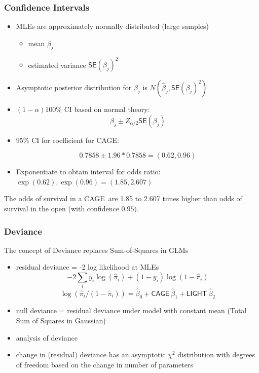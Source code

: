 \documentclass[handout]{beamer}\usepackage[]{graphicx}\usepackage[]{color}
\def\SE{\textsf{SE}}
\def\C{\textsf{CAGE}}
\def\L{\textsf{LIGHT}}
\begin{document}
\begin{frame}[fragile]\frametitle{Confidence Intervals}


  \begin{itemize}
  \item MLEs are approximately normally distributed (large samples) \pause
    \begin{itemize}
    \item mean $\beta_j$ \pause
    \item estimated variance $\SE(\beta_j)^2$ \pause
    \end{itemize}
\item Asymptotic posterior distribution for $\beta_j$ is
  $N(\hat{\beta}_j, \SE(\beta_j)^2)$ \pause
\item $(1 - \alpha) 100\%$ CI based on normal theory:
$$ \hat{\beta}_j \pm Z_{\alpha/2} \SE(\beta_j)$$ \pause
\item $95\%$ CI for coefficient for \C:

$$  0.7858\pm 1.96 * 0.7858 = (0.62, 0.96) $$ \pause
\item Exponentiate to obtain interval for odds ratio:
$\exp(0.62), \exp(0.96) = (1.85, 2.607)$ \pause
  \end{itemize}
 The odds of survival in a \C\  are 1.85 to 2.607 times higher than odds of  survival in the open (with confidence  $0.95)$.
\end{frame}


\begin{frame}[fragile]\frametitle{Deviance}
The concept of Deviance replaces Sum-of-Squares in GLMs \pause
\begin{itemize}
\item residual deviance = -2 log likelihood at MLEs \pause
$$ -2 \sum_i y_i\log(\hat{\pi}_i) + (1 - y_i)\log(1 - \hat{\pi}_i)$$
$$\log(\hat{\pi}_i/(1 - \hat{\pi}_i)) = \hat{\beta}_0 + \C\ \hat{\beta}_1 + \L\ \hat{\beta}_2$$
\item null deviance = residual deviance under model with constant mean (Total
  Sum of Squares in Gaussian) \pause
\item analysis of deviance \pause
\item change in (residual) deviance has an asymptotic $\chi^2$
  distribution with degrees of freedom based on the change in
  number of parameters  \pause
\end{itemize}
\end{frame}
\end{document}
